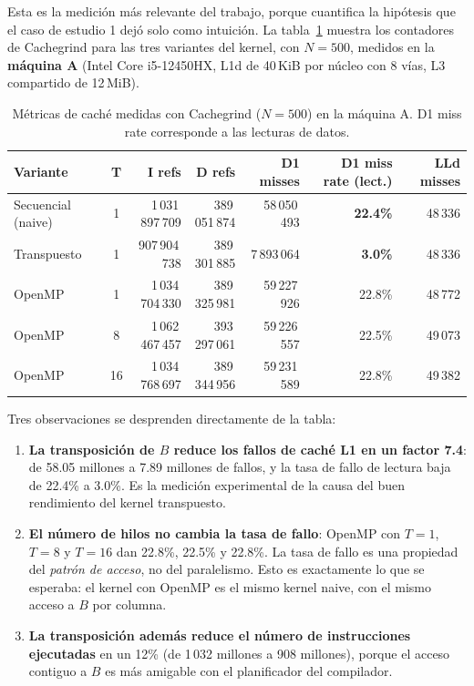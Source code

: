Esta es la medición más relevante del trabajo, porque cuantifica la hipótesis que el caso de estudio 1 dejó solo como intuición. La tabla~\ref{tab:cachegrind} muestra los contadores de Cachegrind para las tres variantes del kernel, con $N=500$, medidos en la \textbf{máquina A} (Intel Core i5-12450HX, L1d de 40\,KiB por núcleo con 8 vías, L3 compartido de 12\,MiB).

\begin{table}[ht]
\centering
\scriptsize
\begin{tabular}{|l|c|r|r|r|r|r|}
\hline
\textbf{Variante} & \textbf{T} & \textbf{I refs} & \textbf{D refs} & \textbf{D1 misses} & \textbf{D1 miss rate (lect.)} & \textbf{LLd misses} \\
\hline
Secuencial (naive)  & 1  & 1\,031\,897\,709 & 389\,051\,874 & 58\,050\,493 & \textbf{22.4\%} & 48\,336 \\
Transpuesto          & 1  &   907\,904\,738 & 389\,301\,885 &  7\,893\,064 & \textbf{3.0\%}  & 48\,336 \\
OpenMP               & 1  & 1\,034\,704\,330 & 389\,325\,981 & 59\,227\,926 & 22.8\% & 48\,772 \\
OpenMP               & 8  & 1\,062\,467\,457 & 393\,297\,061 & 59\,226\,557 & 22.5\% & 49\,073 \\
OpenMP               & 16 & 1\,034\,768\,697 & 389\,344\,956 & 59\,231\,589 & 22.8\% & 49\,382 \\
\hline
\end{tabular}
\caption{Métricas de caché medidas con Cachegrind ($N=500$) en la máquina A. D1 miss rate corresponde a las lecturas de datos.}
\label{tab:cachegrind}
\end{table}

Tres observaciones se desprenden directamente de la tabla:

\begin{enumerate}
    \item \textbf{La transposición de $B$ reduce los fallos de caché L1 en un factor 7.4}: de 58.05 millones a 7.89 millones de fallos, y la tasa de fallo de lectura baja de 22.4\% a 3.0\%. Es la medición experimental de la causa del buen rendimiento del kernel transpuesto.
    \item \textbf{El número de hilos no cambia la tasa de fallo}: OpenMP con $T=1$, $T=8$ y $T=16$ dan 22.8\%, 22.5\% y 22.8\%. La tasa de fallo es una propiedad del \emph{patrón de acceso}, no del paralelismo. Esto es exactamente lo que se esperaba: el kernel con OpenMP es el mismo kernel naive, con el mismo acceso a $B$ por columna.
    \item \textbf{La transposición además reduce el número de instrucciones ejecutadas} en un 12\% (de 1\,032 millones a 908 millones), porque el acceso contiguo a $B$ es más amigable con el planificador del compilador.
\end{enumerate}

